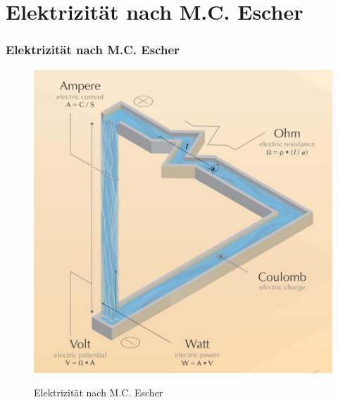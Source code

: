 \section*{Elektrizität nach M.C. Escher}
\begin{frame}
	\frametitle{Elektrizität nach M.C. Escher}
\begin{figure}
	\includegraphics[width=\textwidth,height=.8\textheight,keepaspectratio]{e03/electricity_crop.jpg}\\
	\caption{Elektrizität nach M.C. Escher \cite{escher}}
	\label{fig_escher}
\end{figure}	
\end{frame}




